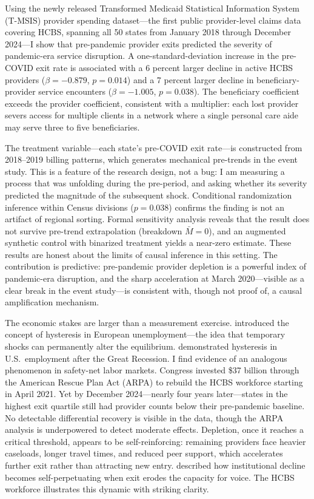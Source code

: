 \documentclass[12pt]{article}
\begin{document}
Using the newly released Transformed Medicaid Statistical Information System (T-MSIS) provider spending dataset---the first public provider-level claims data covering HCBS, spanning all 50 states from January 2018 through December 2024---I show that pre-pandemic provider exits predicted the severity of pandemic-era service disruption. A one-standard-deviation increase in the pre-COVID exit rate is associated with a 6 percent larger decline in active HCBS providers ($\beta = -0.879$, $p = 0.014$) and a 7 percent larger decline in beneficiary-provider service encounters ($\beta = -1.005$, $p = 0.038$). The beneficiary coefficient exceeds the provider coefficient, consistent with a multiplier: each lost provider severs access for multiple clients in a network where a single personal care aide may serve three to five beneficiaries.

The treatment variable---each state's pre-COVID exit rate---is constructed from 2018--2019 billing patterns, which generates mechanical pre-trends in the event study. This is a feature of the research design, not a bug: I am measuring a process that was unfolding during the pre-period, and asking whether its severity predicted the magnitude of the subsequent shock. Conditional randomization inference within Census divisions ($p = 0.038$) confirms the finding is not an artifact of regional sorting. Formal sensitivity analysis \citep{rambachan2023} reveals that the result does not survive pre-trend extrapolation (breakdown $\bar{M} = 0$), and an augmented synthetic control \citep{benmichael2021} with binarized treatment yields a near-zero estimate. These results are honest about the limits of causal inference in this setting. The contribution is predictive: pre-pandemic provider depletion is a powerful index of pandemic-era disruption, and the sharp acceleration at March 2020---visible as a clear break in the event study---is consistent with, though not proof of, a causal amplification mechanism.

The economic stakes are larger than a measurement exercise. \citet{blanchardsummers1986} introduced the concept of hysteresis in European unemployment---the idea that temporary shocks can permanently alter the equilibrium. \citet{yagan2019} demonstrated hysteresis in U.S.\ employment after the Great Recession. I find evidence of an analogous phenomenon in safety-net labor markets. Congress invested \$37 billion through the American Rescue Plan Act (ARPA) to rebuild the HCBS workforce starting in April 2021. Yet by December 2024---nearly four years later---states in the highest exit quartile still had provider counts below their pre-pandemic baseline. No detectable differential recovery is visible in the data, though the ARPA analysis is underpowered to detect moderate effects. Depletion, once it reaches a critical threshold, appears to be self-reinforcing: remaining providers face heavier caseloads, longer travel times, and reduced peer support, which accelerates further exit rather than attracting new entry. \citet{hirschman1970} described how institutional decline becomes self-perpetuating when exit erodes the capacity for voice. The HCBS workforce illustrates this dynamic with striking clarity.
\end{document}
